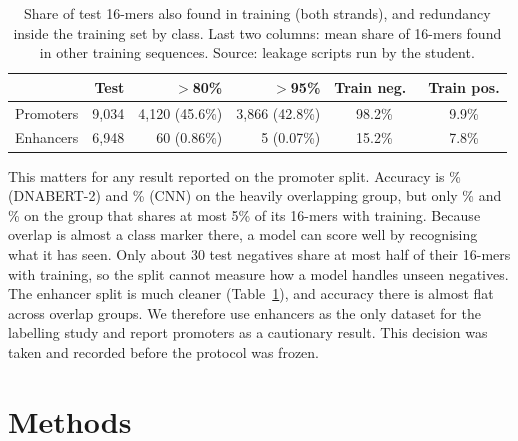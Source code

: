 \documentclass[11pt]{article}
\begin{document}
\begin{table}[t]
\centering\small
\begin{tabular}{lrrrcc}
\toprule
 & Test & $>$80\% & $>$95\% & Train neg.\ & Train pos.\\
\midrule
Promoters & 9{,}034 & 4{,}120 (45.6\%) & 3{,}866 (42.8\%) & 98.2\% & 9.9\%\\
Enhancers & 6{,}948 & 60 (0.86\%) & 5 (0.07\%) & 15.2\% & 7.8\%\\
\bottomrule
\end{tabular}
\caption{Share of test 16-mers also found in training (both strands), and redundancy inside the training set by class. Last two columns: mean share of 16-mers found in other training sequences. Source: leakage scripts run by the student.}\label{tab:leak}
\end{table}

\begin{table}[t]
\centering\small

\caption{Promoters: test accuracy by overlap with training, mean over seeds 0--3 (seed 4 was not yet finished when this analysis was run). The positive share per group was measured directly. The low-overlap group is almost entirely positive, so accuracy there is essentially recall on positives.}\label{tab:strat}
\end{table}

This matters for any result reported on the promoter split. Accuracy is \StratHighDna\% (DNABERT-2) and \StratHighCnn\% (CNN) on the heavily overlapping group, but only \StratLowDna\% and \StratLowCnn\% on the group that shares at most 5\% of its 16-mers with training. Because overlap is almost a class marker there, a model can score well by recognising what it has seen. Only about 30 test negatives share at most half of their 16-mers with training, so the split cannot measure how a model handles unseen negatives. The enhancer split is much cleaner (Table~\ref{tab:leak}), and accuracy there is almost flat across overlap groups. We therefore use enhancers as the only dataset for the labelling study and report promoters as a cautionary result. This decision was taken and recorded before the protocol was frozen.

\section{Methods}
\end{document}
